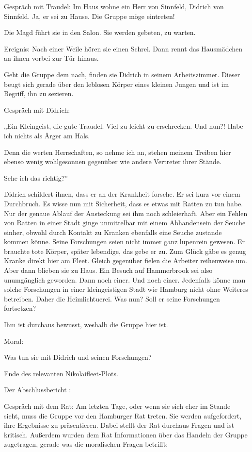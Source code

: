 Gespräch mit Traudel: Im Haus wohne ein Herr von Sinnfeld, Didrich von Sinnfeld. Ja, er sei zu Hause. Die Gruppe möge eintreten!

Die Magd führt sie in den Salon. Sie werden gebeten, zu warten.

Ereignis: Nach einer Weile hören sie einen Schrei. Dann rennt das Hausmädchen an ihnen vorbei zur Tür hinaus.

Geht die Gruppe dem nach, finden sie Didrich in seinem Arbeitszimmer. Dieser beugt sich gerade über den leblosen Körper eines kleinen Jungen und ist im Begriff, ihn zu sezieren.

Gespräch mit Didrich:

„Ein Kleingeist, die gute Traudel. Viel zu leicht zu erschrecken. Und nun?! Habe ich nichts als Ärger am Hals.

Denn die werten Herrschaften, so nehme ich an, stehen meinem Treiben hier ebenso wenig wohlgesonnen gegenüber wie andere Vertreter ihrer Stände.

Sehe ich das richtig?”

Didrich schildert ihnen, dass er an der Krankheit forsche. Er sei kurz vor einem Durchbruch. Es wisse nun mit Sicherheit, dass es etwas mit Ratten zu tun habe. Nur der genaue Ablauf der Ansteckung sei ihm noch schleierhaft. Aber ein Fehlen von Ratten in einer Stadt ginge unmittelbar mit einem Abhandensein der Seuche einher, obwohl durch Kontakt zu Kranken ebenfalls eine Seuche zustande kommen könne. Seine Forschungen seien nicht immer ganz lupenrein gewesen. Er brauchte tote Körper, später lebendige, das gebe er zu. Zum Glück gäbe es genug Kranke direkt hier am Fleet. Gleich gegenüber fielen die Arbeiter reihenweise um. Aber dann blieben sie zu Haus. Ein Besuch auf Hammerbrook sei also unumgänglich geworden. Dann noch einer. Und noch einer. Jedenfalls könne man solche Forschungen in einer kleingeistigen Stadt wie Hamburg nicht ohne Weiteres betreiben. Daher die Heimlichtuerei. Was nun? Soll er seine Forschungen fortsetzen?

Ihm ist durchaus bewusst, weshalb die Gruppe hier ist.


Moral:

Was tun sie mit Didrich und seinen Forschungen?

Ende des relevanten Nikolaifleet-Plots.

Der Abschlussbericht
:

Gespräch mit dem Rat: Am letzten Tage, oder wenn sie sich eher im Stande sieht, muss die Gruppe vor den Hamburger Rat treten. Sie werden aufgefordert, ihre Ergebnisse zu präsentieren. Dabei stellt der Rat durchaus Fragen und ist kritisch. Außerdem wurden dem Rat Informationen über das Handeln der Gruppe zugetragen, gerade was die moralischen Fragen betrifft:

